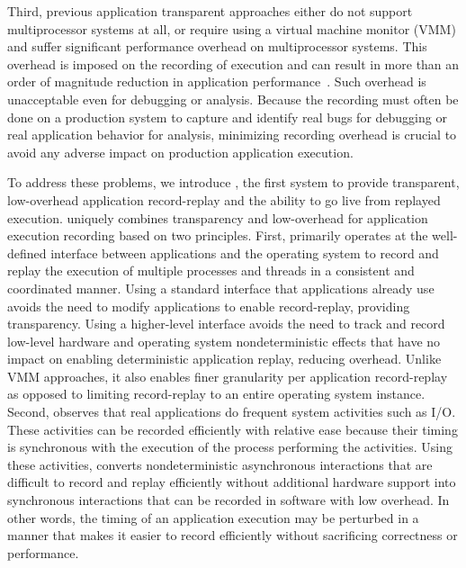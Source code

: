 Third, previous application transparent approaches either do not
support multiprocessor systems at all, or require using a virtual
machine monitor (VMM) and suffer significant
performance overhead on multiprocessor systems.   This overhead is
imposed on the recording of execution and can result in more than an
order of magnitude reduction in application
performance~\cite{smp-revirt}. Such
overhead is unacceptable even for debugging or analysis. Because
the recording must often be done on a production system to capture and 
identify real bugs for debugging or real application behavior for
analysis, minimizing recording overhead is
crucial to avoid any adverse impact on production application
execution. 

To address these problems, we introduce \scribe{}, the first system
to provide transparent, low-overhead application record-replay and the
ability to go live from replayed execution.  \scribe{}
uniquely combines transparency and low-overhead for application
execution recording based on two principles.  First, \scribe{}
primarily operates at the well-defined interface between applications
and the operating system to record and replay the execution of
multiple processes and threads in a consistent and coordinated manner.
Using a standard interface that applications already use avoids the
need to modify applications to enable record-replay, providing
transparency.  Using a higher-level interface avoids the need to track
and record low-level hardware and operating system
nondeterministic effects that have no impact on enabling deterministic
application replay, reducing overhead. Unlike VMM approaches, it also
enables finer granularity per application record-replay as opposed to
limiting record-replay to an entire operating system instance.
Second, \scribe{} observes that real applications
do frequent system activities such as I/O.  These activities can be
recorded efficiently with relative ease because their timing is
synchronous with the execution of the process performing the
activities.  Using these activities, \scribe{} converts
nondeterministic asynchronous interactions that are difficult to
record and replay efficiently without additional hardware support into 
synchronous interactions that can be recorded in software with low
overhead.  In other words, the timing of an application execution may
be perturbed in a manner that makes it easier to record efficiently
without sacrificing correctness or performance.  

